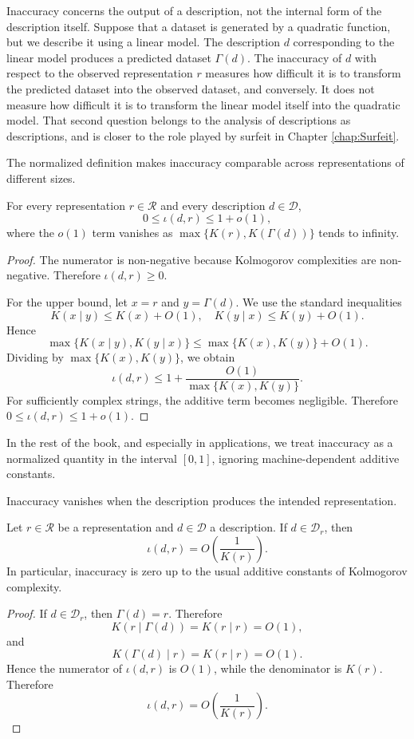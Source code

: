 \begin{example}
Inaccuracy concerns the output of a description, not the internal form of the description itself. Suppose that a dataset is generated by a quadratic function, but we describe it using a linear model. The description $d$ corresponding to the linear model produces a predicted dataset $\Gamma(d)$. The inaccuracy of $d$ with respect to the observed representation $r$ measures how difficult it is to transform the predicted dataset into the observed dataset, and conversely. It does not measure how difficult it is to transform the linear model itself into the quadratic model. That second question belongs to the analysis of descriptions as descriptions, and is closer to the role played by surfeit in Chapter \ref{chap:Surfeit}.
\end{example}

The normalized definition makes inaccuracy comparable across representations of different sizes.

\begin{proposition}
\label{prop:inaccuracy:inaccuracy:relative_range}
For every representation $r \in \mathcal{R}$ and every description $d \in \mathcal D$,
\[
0 \leq \iota(d,r) \leq 1 + o(1),
\]
where the $o(1)$ term vanishes as $\max\{K(r),K(\Gamma(d))\}$ tends to infinity.
\end{proposition}
\begin{proof}
The numerator is non-negative because Kolmogorov complexities are non-negative. Therefore $\iota(d,r)\geq 0$.

For the upper bound, let $x=r$ and $y=\Gamma(d)$. We use the standard inequalities
\[
K(x\mid y) \leq K(x)+O(1), \quad K(y\mid x) \leq K(y)+O(1).
\]
Hence
\[
\max\{K(x\mid y),K(y\mid x)\} \leq \max\{K(x),K(y)\}+O(1).
\]
Dividing by \(\max\{K(x),K(y)\}\), we obtain
\[
\iota(d,r) \leq 1+ \frac{O(1)}{\max\{K(x),K(y)\}}.
\]
For sufficiently complex strings, the additive term becomes negligible. Therefore $0 \leq \iota(d,r) \leq 1+o(1)$.
\end{proof}

In the rest of the book, and especially in applications, we treat inaccuracy as a normalized quantity in the interval \([0,1]\), ignoring machine-dependent additive constants.

Inaccuracy vanishes when the description produces the intended representation.

\begin{proposition}
\label{prop:inaccuracy_perfect_description}
Let $r \in \mathcal{R}$ be a representation and $d \in \mathcal D$ a description. If $d \in \mathcal D_r$, then
\[
\iota(d,r)=O\left(\frac{1}{K(r)}\right).
\]
In particular, inaccuracy is zero up to the usual additive constants of Kolmogorov complexity.
\end{proposition}
\begin{proof}
If $d \in \mathcal D_r$, then $\Gamma(d)=r$. Therefore
\[
K(r\mid \Gamma(d)) = K(r \mid r) = O(1),
\]
and
\[
K(\Gamma(d)\mid r) = K(r\mid r) = O(1).
\]
Hence the numerator of $\iota(d,r)$ is $O(1)$, while the denominator is $K(r)$. Therefore
\[
\iota(d,r) = O\left(\frac{1}{K(r)}\right).
\]
\end{proof}


